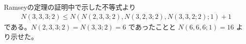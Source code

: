 \subsection{}
Ramseyの定理の証明中で示した不等式より
\begin{align*}
N(3,3,3;2) \leq N(N(2,3,3;2),N(3,2,3;2),N(3,3,2;2);1)+1
\end{align*}
である。$N(2,3,3;2)=N(3,3;2)=6$ であったことと $N(6,6,6;1)=16$ より示せた。
